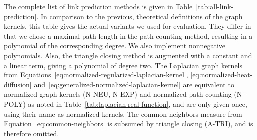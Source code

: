 \documentclass[11pt,a4paper]{book}
\begin{document}
The complete list of link prediction methods is given in
Table~\ref{tab:all-link-prediction}.  In comparison to the previous,
theoretical definitions of the graph kernels, this table gives the
actual variants we used for evaluation.  They differ in that we chose a
maximal path length in the path counting method, resulting in a polynomial of
the corresponding degree.  We also implement nonnegative polynomials.
Also, the triangle closing method is augmented with a constant and a
linear term, giving a polynomial of degree two.  The Laplacian graph
kernels from Equations~\ref{eq:normalized-regularized-laplacian-kernel},
\ref{eq:normalized-heat-diffusion}
and~\ref{eq:generalized-normalized-laplacian-kernel} are equivalent to
normalized graph kernels (\textrm{N-NEU}, \textrm{N-EXP}) and normalized
path counting (\textrm{N-POLY}) as noted in
Table~\ref{tab:laplacian-real-function}, and are only given once, using
their name as normalized kernels.  The common neighbors measure from
Equation~\ref{eq:common-neighbors} is subsumed by triangle closing
(\textrm{A-TRI}), and is therefore omitted.
\end{document}
